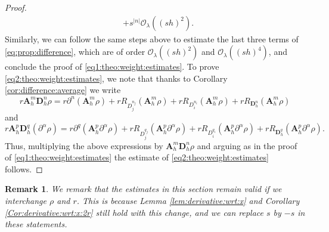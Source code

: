 \documentclass[11pt,oneside,leqno]{amsart}
\numberwithin{equation}{section}
\numberwithin{equation}{section}
\newtheorem{remark}[theorem]{Remark}
\begin{document}
\begin{proof}
\begin{align*}
    &+s^{|n|}\mathcal{O}_{\lambda}((sh)^{2}).
    \end{align*}
    Similarly, we can follow the same steps above to estimate the last three terms of \eqref{eq:prop:difference}, which are of order $\mathcal{O}_{\lambda}((sh)^{2})$ and $\mathcal{O}_{\lambda}((sh)^{4})$, and conclude the proof of \eqref{eq1:theo:weight:estimates}. To prove \eqref{eq2:theo:weight:estimates}, we note that thanks to Corollary \ref{cor:difference:average} we write
   \begin{equation*}
    r\mathbf{A}_{h}^{m}\mathbf{D}_{h}^{n}\rho= r\partial^{n}(\mathbf{A}_{h}^{m}\rho)+rR_{D^{n_{j}}_{j}}(\mathbf{A}_{h}^{m}\rho)+rR_{D^{n_{i}}_{i}}(\mathbf{A}_{h}^{m}\rho)+rR_{\mathbf{D}_{h}^{n}}(\mathbf{A}_{h}^{m}\rho)
\end{equation*}
and 
\begin{equation*}
    r\mathbf{A}_{h}^{p}\mathbf{D}_{h}^{q}(\partial^{\alpha}\rho)= r\partial^{q}(\mathbf{A}_{h}^{p}\partial^{\alpha}\rho)+rR_{D^{q_{j}}_{j}}(\mathbf{A}_{h}^{p}\partial^{\alpha}\rho)+rR_{D^{q_{i}}_{i}}(\mathbf{A}_{h}^{p}\partial^{\alpha}\rho)+rR_{\mathbf{D}_{h}^{q}}(\mathbf{A}_{h}^{p}\partial^{\alpha}\rho).
\end{equation*}
Thus, multiplying the above expressions by $\mathbf{A}_{h}^{m}\mathbf{D}_{h}^{n}\rho$ and arguing as in the proof of \eqref{eq1:theo:weight:estimates} the estimate of \eqref{eq2:theo:weight:estimates} follows.
\end{proof}
\begin{remark}
We remark that the estimates in this section remain valid if we interchange $\rho$ and $r$. This is because Lemma \ref{lem:derivative:wrt:x} and Corollary \ref{Cor:derivative:wrt:x:2r} still hold with this change, and we can replace $s$ by $-s$ in these statements. 
\end{remark}
\end{document}
